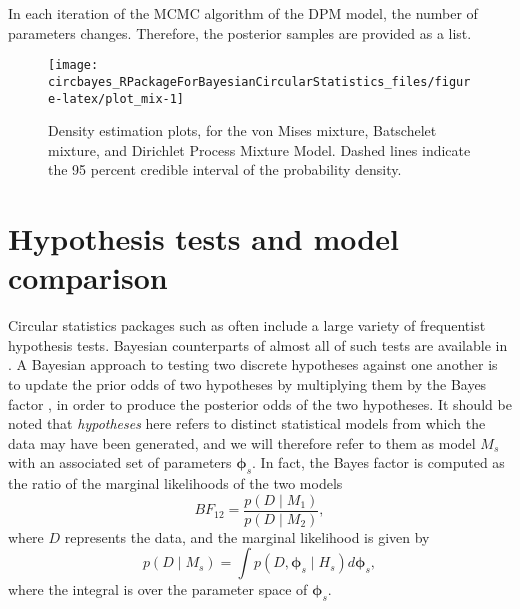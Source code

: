 In each iteration of the MCMC algorithm of the DPM model, the number of
parameters changes. Therefore, the posterior samples are provided as a
list.

\begin{CodeChunk}
\begin{figure}

{\centering \texttt{[image: circbayes\_RPackageForBayesianCircularStatistics\_files/figure-latex/plot\_mix-1]} 

}

\caption[Density estimation plots, for the von Mises mixture, Batschelet mixture, and Dirichlet Process Mixture Model]{Density estimation plots, for the von Mises mixture, Batschelet mixture, and Dirichlet Process Mixture Model. Dashed lines indicate the 95 percent credible interval of the probability density.}\label{fig:plot_mix}
\end{figure}
\end{CodeChunk}

\hypertarget{hypothesis-tests-and-model-comparison}{%
\section{Hypothesis tests and model
comparison}\label{hypothesis-tests-and-model-comparison}}

\label{hyptest}

Circular statistics packages such as  often include a
large variety of frequentist hypothesis tests. Bayesian counterparts of
almost all of such tests are available in . A Bayesian
approach to testing two discrete hypotheses against one another is to
update the prior odds of two hypotheses by multiplying them by the Bayes
factor \citep{kass1995bayes, jeffreys1961theory}, in order to produce
the posterior odds of the two hypotheses. It should be noted that
\textit{hypotheses} here refers to distinct statistical models from
which the data may have been generated, and we will therefore refer to
them as model \(M_s\) with an associated set of parameters
\(\boldsymbol{\phi}_s\). In fact, the Bayes factor is computed as the
ratio of the marginal likelihoods of the two models \begin{equation}
BF_{12} = \frac{p(D \mid M_1)}{p(D \mid M_2)},
\end{equation} where \(D\) represents the data, and the marginal
likelihood is given by \begin{equation} \label{eqn:marglik}
p(D \mid M_s) = \int p(D, \boldsymbol{\phi}_s \mid H_s) d \boldsymbol{\phi}_s,
\end{equation} where the integral is over the parameter space of
\(\boldsymbol{\phi}_s.\)

